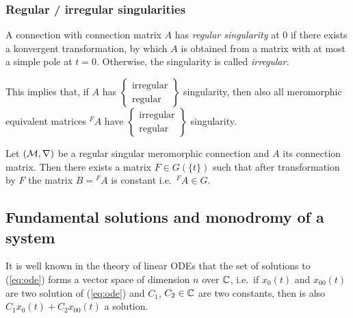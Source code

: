 \subsubsection{Regular / irregular singularities}
\begin{defn}
  A connection with connection matrix $A$ has \emph{regular singularity} at $0$
  if there exists a konvergent transformation, by which $A$ is obtained from a
  matrix with at most a simple pole at $t=0$.
  Otherwise, the singularity is called \emph{irregular}.
  \begin{s-rem}
    This implies that, if $A$ has
    $\left\{\substack{\text{irregular}\\\text{regular}}\right\}$
    singularity, then also all
    meromorphic equivalent matrices ${}^{F}\!A$ have
    $\left\{\substack{\text{irregular}\\\text{regular}}\right\}$
    singularity.
  \end{s-rem}
  \begin{comment}
    \begin{s-rem}
      \marginnote{\cite[150]{van2003galois}}
      One can express this notion of regular singular also in terms of
      $\delta:=t\frac{d}{dt}$. A system has regular singularity if it is
      equivalent to an equation $\delta-A$ where $A$ has entries in
      holomorphic functions in a neighbourhood of $z=0$.
    \end{s-rem}
  \end{comment}
\end{defn}
\begin{thm}
  Let $(\mathcal{M},\nabla)$ be a regular singular meromorphic connection and $A$ its
  connection matrix.
  Then there exists a matrix $F\in G(\!\{t\}\!)$ such that after transformation
  by $F$ the matrix $B={}^F\!A$ is constant i.e.\ ${}^F\!A\in G$.
\end{thm}

\subsection{Fundamental solutions and monodromy of a system}
It is well known in the theory of linear ODEs that the set of solutions to
(\ref{eq:ode}) forms a vector space of dimension $n$ over $\mathbb{C}$, i.e.\ if
$x_0(t)$ and $x_{00}(t)$ are two solution of (\ref{eq:ode}) and $C_1$,
$C_2\in\mathbb{C}$ are two constants, then is also $C_1x_0(t)+C_2x_{00}(t)$ a solution.

